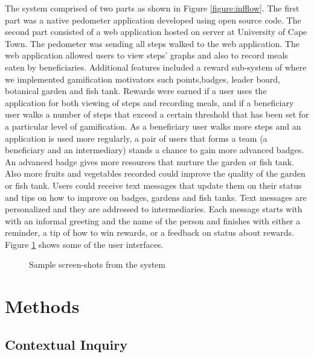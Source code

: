 \documentclass{sig-alternate}
\begin{document}
The system comprised of two parts as shown in Figure \ref{figure:infflow}. The
first part was a  native pedometer application developed using open source
code. The second part consisted of a web application hosted on server at
University of Cape Town. The pedometer was sending all steps walked to the web
application. The web application allowed users to view steps' graphs and also
to record meals eaten by beneficiaries. Additional features included a reward
sub-system of where we implemented gamification motivators such points,badges,
leader board, botanical garden and fish tank. Rewards were earned if a user
uses the application for both viewing of steps and  recording meals, and if a
beneficiary user walks a number of steps that exceed a certain threshold that
has been set for a particular level of gamification. As a beneficiary user
walks more steps and an application is used more regularly, a pair of users
that forms a team (a beneficiary and an intermediary)  stands a chance to gain
more advanced badges. An advanced badge gives more resources that nurture the
garden or fish tank. Also more fruits and vegetables recorded could improve
the quality of the garden or fish tank. Users could receive text messages that
update them on their status and tips on how to improve on badges, gardens and
fish tanks. Text messages are personalized and they are addressed to
intermediaries. Each message starts with with an informal greeting and the
name of the person and finishes with either a reminder, a tip of how to win
rewards, or a feedback on status about rewards. Figure \ref{figure:screens}
shows some of the user interfaces.

 \begin{figure*}
\centering
{}
\caption{Information flow inside the system}
\label{figure:infflow}
\end{figure*}
\begin{figure}
\centering
{}
\caption{Sample screen-shots from the system}
\label{figure:screens}
\end{figure}

\section{Methods}
\subsection{Contextual Inquiry}
\end{document}
